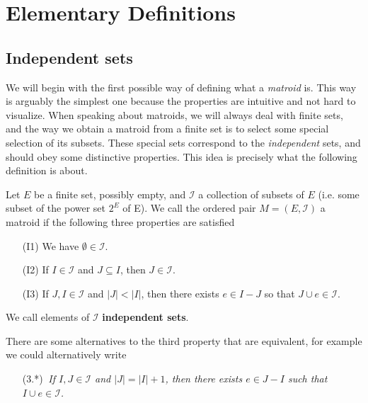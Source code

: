 \newpage
\section{Elementary Definitions}

\subsection{Independent sets}

We will begin with the first possible way of defining what a \textit{matroid} is. This way is arguably the simplest one because the properties are intuitive and not hard to visualize. When speaking about matroids, we will always deal with finite sets, and the way we obtain a matroid from a finite set is to select some special selection of its subsets.  These special sets correspond to the \textit{independent} sets, and should obey some distinctive properties. This idea is precisely what the following definition is about.

\begin{defn}
    Let $E$ be a finite set, possibly empty, and $\mathcal{I}$ a collection of subsets of $E$ (i.e. some subset of the power set $2^E$ of E). We call the ordered pair $M = (E, \mathcal{I})$ a matroid if the following three properties are satisfied

    \begin{enumerate}
        \item[(I1)] We have $\emptyset \in \mathcal{I}$.
        
        \item[(I2)] If $I \in \mathcal{I}$ and $J \subseteq I$, then $J \in \mathcal{I}$.
        
        \item[(I3)] If $J, I \in \mathcal{I}$ and $|J| < |I|$, then there exists $e \in I - J$ so that $J \cup e \in \mathcal{I}$.
    \end{enumerate}

    We call elements of $\mathcal{I}$ \textbf{independent sets}. 
\end{defn}

There are some alternatives to the third property that are equivalent, for example we could alternatively write

\begin{enumerate}
    \item [(3.*)$\ $] \textit{ If $I, J \in \mathcal{I} $ and $|J| = |I| + 1$, then there exists $e \in J - I$ such that $I \cup e \in \mathcal{I}$.}
\end{enumerate}

